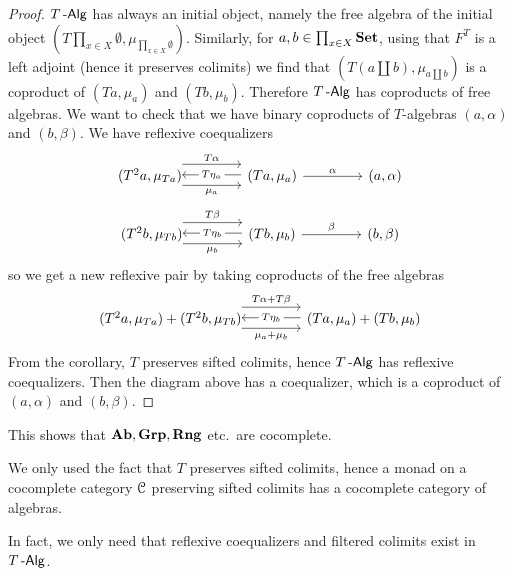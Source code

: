 \documentclass[a4paper,11pt,oneside,openany]{scrbook}
\begin{document}
\begin{proof}
	$T\operatorname{-\mathsf{Alg}}$ has always an initial object, namely the free algebra of the initial
	object $\left(T\prod_{x\in X}\emptyset,\mu_{\prod_{x\in
				X}\emptyset}\right)$. Similarly, for $a,b\in\prod_{x\in X}{\normalfont\textbf{Set}}$, using that
	$F^T$ is a left adjoint (hence it preserves colimits) we find that
	$\left(T\left(a\coprod b\right),\mu_{a\coprod b}\right)$ is a coproduct of
	$(Ta,\mu_a)$ and $(Tb,\mu_b)$. Therefore $T\operatorname{-\mathsf{Alg}}$ has coproducts of free
	algebras. We want to check that we have binary coproducts of $T$-algebras
	$(a,\alpha)$ and $(b,\beta)$. We have reflexive coequalizers
	\[
		\begin{tikzcd}[column sep=1.5cm]
			(T^2a,\mu_{Ta})\hspace{-1.5mm}\arrow[r, shift right=1.5ex, "\mu_a"']  \arrow[r, shift left=2ex, "T\alpha"] & (Ta,\mu_a)\arrow[l, shift right=.25ex, "T\eta_a"description]\arrow[r,"\alpha"]&(a,\alpha)
		\end{tikzcd}
	\]
	\[
		\begin{tikzcd}[column sep=1.5cm]
			(T^2b,\mu_{Tb})\hspace{-1.5mm}\arrow[r, shift right=1.5ex, "\mu_b"']  \arrow[r, shift left=2ex, "T\beta"] & (Tb,\mu_b)\arrow[l, shift right=.25ex, "T\eta_b"description]\arrow[r,"\beta"]&(b,\beta)
		\end{tikzcd}
	\]
	so we get a new reflexive pair by taking coproducts of the free algebras
	\[
		\begin{tikzcd}[column sep=1.5cm]
			(T^2a,\mu_{Ta})+(T^2b,\mu_{Tb})\hspace{-1.5mm}\arrow[r, shift right=1.5ex, "\mu_a+\mu_b"']  \arrow[r, shift left=2ex, "T\alpha+T\beta"] & (Ta,\mu_a)+(Tb,\mu_b)\arrow[l, shift right=.25ex, "T\eta_b"description]
		\end{tikzcd}
	\]
	From the corollary, $T$ preserves sifted colimits, hence $T\operatorname{-\mathsf{Alg}}$ has reflexive coequalizers. Then the diagram above has a coequalizer, which is a coproduct of $(a,\alpha)$ and $(b,\beta)$.
\end{proof}
\begin{rmk}
	This shows that ${\normalfont\textbf{Ab}},\mathbf{Grp},\mathbf{Rng}$ etc.\ are cocomplete.
\end{rmk}
\begin{rmk}
	We only used the fact that $T$ preserves sifted colimits, hence a monad on a cocomplete category $\operatorname{\mathcal{C}}$ preserving sifted colimits has a cocomplete category of algebras.
\end{rmk}
\begin{rmk}
	In fact, we only need that reflexive coequalizers and filtered colimits exist in $T\operatorname{-\mathsf{Alg}}$.
\end{rmk}
\end{document}
